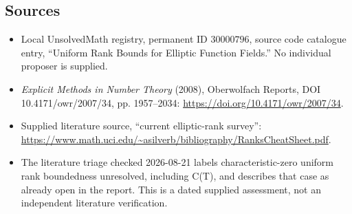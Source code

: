 \documentclass[11pt]{article}
\begin{document}
\subsection{Sources}
\begin{itemize}
\item Local UnsolvedMath registry, permanent ID \(30000796\), source code catalogue entry, ``Uniform Rank Bounds for Elliptic Function Fields.'' No individual proposer is supplied.
\item \emph{Explicit Methods in Number Theory} (2008), Oberwolfach Reports, DOI 10.4171/owr/2007/34, pp. 1957--2034: \url{https://doi.org/10.4171/owr/2007/34}.
\item Supplied literature source, ``current elliptic-rank survey'': \url{https://www.math.uci.edu/~asilverb/bibliography/RanksCheatSheet.pdf}.
\item The literature triage checked 2026-08-21 labels characteristic-zero uniform rank boundedness unresolved, including C(T), and describes that case as already open in the report. This is a dated supplied assessment, not an independent literature verification.
\end{itemize}
\end{document}
